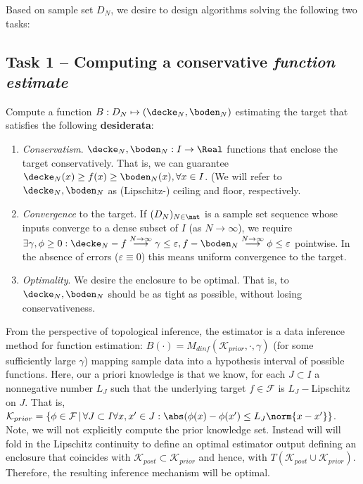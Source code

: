  Based on sample set $D_N$, we desire to design algorithms solving the following two
tasks:

\subsection{Task 1 -- Computing a conservative \textit{function estimate}}
\label{sec:problemdef_task1}
Compute a function $B: D_N \mapsto (\decke_N,\boden_N)$ estimating the target that satisfies the following \textbf{desiderata}:
\begin{enumerate}
	\item \textit{Conservatism}. $\decke_N, \boden_N :I \to \Real$ functions that enclose the target conservatively. That is, 
			we can guarantee  $\decke_N(x) \geq f(x) \geq \boden_N(x), \forall x \in I$. (We will refer to $\decke_N, \boden_N$ as (Lipschitz-) ceiling and floor, respectively. 
				\item \textit{Convergence} to the target. If $(D_N)_{N \in \nat }$ is a sample set sequence whose inputs converge to a dense subset of $I$ (as $N \to \infty$), we require $\exists \gamma, \phi \geq 0: \decke_N - f \stackrel{N \to \infty} \longrightarrow \gamma \leq \varepsilon, f- \boden_N \stackrel{N \to \infty} \longrightarrow \phi \leq \varepsilon$ pointwise. In the absence of errors ($\varepsilon \equiv 0$) this means uniform convergence to the target.
				\item \textit{Optimality}. We desire the enclosure to be optimal. That is, to $\decke_N, \boden_N$ should be as tight as possible, without losing conservativeness.
\end{enumerate}

From the perspective of topological inference, the estimator is a data inference method for function estimation:
$B(\cdot) = M_{dinf}(\mathcal K_{prior}, \cdot, \gamma ) $ (for some sufficiently large $\gamma$) mapping sample data into a hypothesis interval of possible functions. 
Here,  our a priori knowledge is that we know, for each $J \subset I$ a nonnegative number $L_J$ such that the underlying target $f \in \mathcal F$ is $L_J-$Lipschitz on $J$. That is, $\mathcal K_{prior} =\{\phi \in \mathcal F \,|\, \forall J \subset I \forall x,x' \in J: \abs(\phi(x) - \phi(x') \leq L_J \norm{x-x'}\}$. 
Note, we will not explicitly compute the prior knowledge set. Instead will will fold in the Lipschitz continuity to define an optimal estimator output defining an enclosure that coincides with $\mathcal K_{post} \subset \mathcal K_{prior}$ and hence, with $T (\mathcal K_{post} \cup \mathcal K_{prior})$. Therefore, the resulting inference mechanism will be optimal. 

